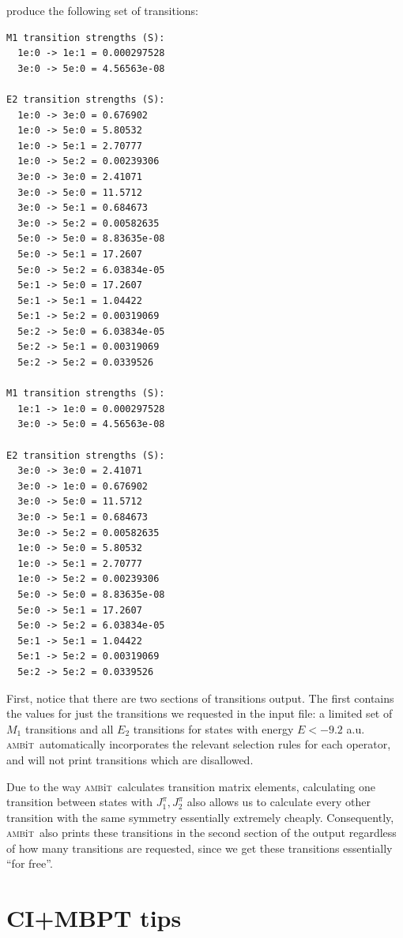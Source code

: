 \documentclass{report}
\newcommand{\ambit}{\textsc{amb}{\footnotesize i}\textsc{t}}
\begin{document}
produce the following set of transitions:

\begin{verbatim}
M1 transition strengths (S):
  1e:0 -> 1e:1 = 0.000297528
  3e:0 -> 5e:0 = 4.56563e-08

E2 transition strengths (S):
  1e:0 -> 3e:0 = 0.676902
  1e:0 -> 5e:0 = 5.80532
  1e:0 -> 5e:1 = 2.70777
  1e:0 -> 5e:2 = 0.00239306
  3e:0 -> 3e:0 = 2.41071
  3e:0 -> 5e:0 = 11.5712
  3e:0 -> 5e:1 = 0.684673
  3e:0 -> 5e:2 = 0.00582635
  5e:0 -> 5e:0 = 8.83635e-08
  5e:0 -> 5e:1 = 17.2607
  5e:0 -> 5e:2 = 6.03834e-05
  5e:1 -> 5e:0 = 17.2607
  5e:1 -> 5e:1 = 1.04422
  5e:1 -> 5e:2 = 0.00319069
  5e:2 -> 5e:0 = 6.03834e-05
  5e:2 -> 5e:1 = 0.00319069
  5e:2 -> 5e:2 = 0.0339526

M1 transition strengths (S):
  1e:1 -> 1e:0 = 0.000297528
  3e:0 -> 5e:0 = 4.56563e-08

E2 transition strengths (S):
  3e:0 -> 3e:0 = 2.41071
  3e:0 -> 1e:0 = 0.676902
  3e:0 -> 5e:0 = 11.5712
  3e:0 -> 5e:1 = 0.684673
  3e:0 -> 5e:2 = 0.00582635
  1e:0 -> 5e:0 = 5.80532
  1e:0 -> 5e:1 = 2.70777
  1e:0 -> 5e:2 = 0.00239306
  5e:0 -> 5e:0 = 8.83635e-08
  5e:0 -> 5e:1 = 17.2607
  5e:0 -> 5e:2 = 6.03834e-05
  5e:1 -> 5e:1 = 1.04422
  5e:1 -> 5e:2 = 0.00319069
  5e:2 -> 5e:2 = 0.0339526
\end{verbatim}

First, notice that there are two sections of transitions output. The first contains the values for just
the transitions we requested in the input file: a limited set of $M_1$ transitions and all $E_2$
transitions for states with energy $E < -9.2$ a.u. \ambit\  automatically incorporates the relevant
selection rules for each operator, and will not print transitions which are disallowed. 

Due to the way \ambit\  calculates transition matrix elements, calculating one transition between states
with $J^{\pi}_1, J^{\pi}_2$ also allows us to calculate every other transition with the same 
symmetry essentially extremely cheaply. Consequently, \ambit\  also prints these transitions in the 
second section of the output regardless of how many transitions are requested, since we get these
transitions essentially ``for free''.

\section{CI+MBPT tips}
\label{sec:CI_tips}
\end{document}
